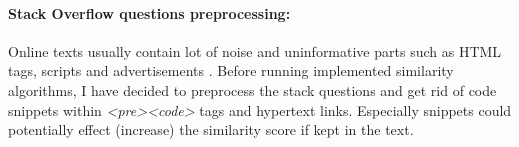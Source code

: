 \paragraph{Stack Overflow questions preprocessing:}  Online texts usually contain lot of noise and uninformative parts such as HTML tags, scripts and advertisements \cite{haddi2013role}. Before running implemented similarity algorithms, I have decided to preprocess the stack questions and get rid of code snippets within \textit{\textless pre\textgreater\textless code\textgreater} tags and hypertext links. Especially snippets could potentially effect (increase) the similarity score if kept in the text.

	